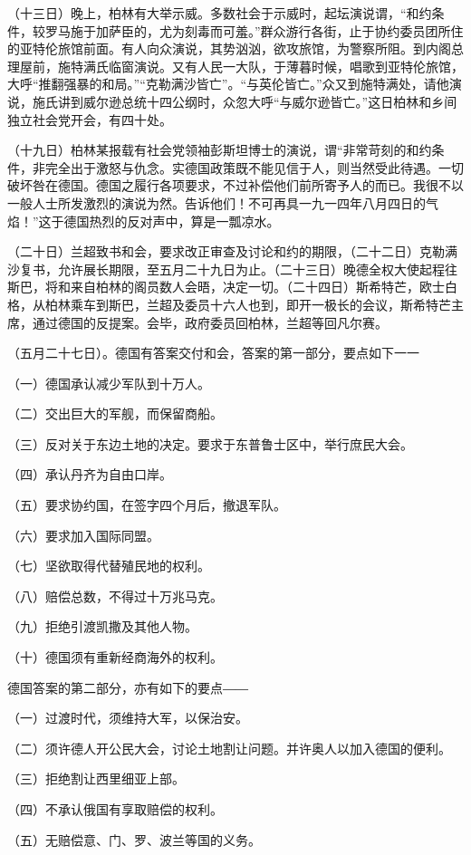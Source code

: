 （十三日）晚上，柏林有大举示威。多数社会于示威时，起坛演说谓，“和约条件，较罗马施于加萨臣的，尤为刻毒而可羞。”群众游行各街，止于协约委员团所住的亚特伦旅馆前面。有人向众演说，其势汹汹，欲攻旅馆，为警察所阻。到内阁总理屋前，施特满氏临窗演说。又有人民一大队，于薄暮时候，唱歌到亚特伦旅馆，大呼“推翻强暴的和局。”“克勒满沙皆亡”。“与英伦皆亡。”众又到施特满处，请他演说，施氏讲到威尔逊总统十四公纲时，众忽大呼“与威尔逊皆亡。”这日柏林和乡间独立社会党开会，有四十处。

（十九日）柏林某报载有社会党领袖彭斯坦博士的演说，谓“非常苛刻的和约条件，非完全出于激怒与仇念。实德国政策既不能见信于人，则当然受此待遇。一切破坏咎在德国。德国之履行各项要求，不过补偿他们前所寄予人的而已。我很不以一般人士所发激烈的演说为然。告诉他们！不可再具一九一四年八月四日的气焰！”这于德国热烈的反对声中，算是一瓢凉水。

（二十日）兰超致书和会，要求改正审查及讨论和约的期限，（二十二日）克勒满沙复书，允许展长期限，至五月二十九日为止。（二十三日）晚德全权大使起程往斯巴，将和来自柏林的阁员数人会晤，决定一切。（二十四日）斯希特芒，欧士白格，从柏林乘车到斯巴，兰超及委员十六人也到，即开一极长的会议，斯希特芒主席，通过德国的反提案。会毕，政府委员回柏林，兰超等回凡尔赛。

（五月二十七日）。德国有答案交付和会，答案的第一部分，要点如下一一

（一）德国承认减少军队到十万人。

（二）交出巨大的军舰，而保留商船。

（三）反对关于东边土地的决定。要求于东普鲁士区中，举行庶民大会。

（四）承认丹齐为自由口岸。

（五）要求协约国，在签字四个月后，撤退军队。

（六）要求加入国际同盟。

（七）坚欲取得代替殖民地的权利。

（八）赔偿总数，不得过十万兆马克。

（九）拒绝引渡凯撒及其他人物。

（十）德国须有重新经商海外的权利。

德国答案的第二部分，亦有如下的要点――

（一）过渡时代，须维持大军，以保治安。

（二）须许德人开公民大会，讨论土地割让问题。并许奥人以加入德国的便利。


（三）拒绝割让西里细亚上部。

（四）不承认俄国有享取赔偿的权利。

（五）无赔偿意、门、罗、波兰等国的义务。

